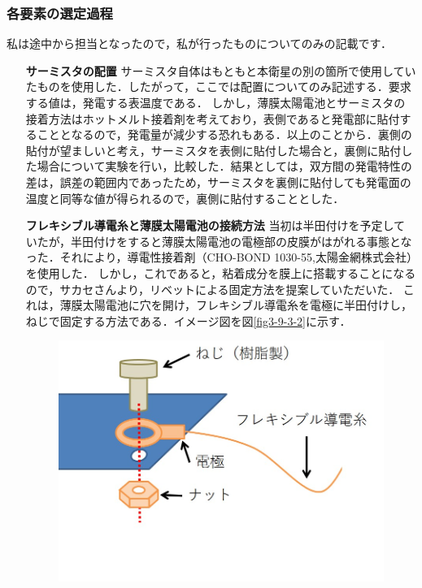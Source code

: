 \subsubsection*{各要素の選定過程}
私は途中から担当となったので，私が行ったものについてのみの記載です．
\begin{itemize}
	\item [\textbf{サーミスタの配置}]
	サーミスタ自体はもともと本衛星の別の箇所で使用していたものを使用した．したがって，ここでは配置についてのみ記述する．要求する値は，発電する表温度である．
	しかし，薄膜太陽電池とサーミスタの接着方法はホットメルト接着剤を考えており，表側であると発電部に貼付することとなるので，発電量が減少する恐れもある．以上のことから．裏側の貼付が望ましいと考え，サーミスタを表側に貼付した場合と，裏側に貼付した場合について実験を行い，比較した．結果としては，双方間の発電特性の差は，誤差の範囲内であったため，サーミスタを裏側に貼付しても発電面の温度と同等な値が得られるので，裏側に貼付することとした．\\
	\item [\textbf{フレキシブル導電糸と薄膜太陽電池の接続方法}]
	当初は半田付けを予定していたが，半田付けをすると薄膜太陽電池の電極部の皮膜がはがれる事態となった．それにより，導電性接着剤（CHO-BOND 1030-55,太陽金網株式会社）を使用した．
	しかし，これであると，粘着成分を膜上に搭載することになるので，サカセさんより，リベットによる固定方法を提案していただいた．
	これは，薄膜太陽電池に穴を開け，フレキシブル導電糸を電極に半田付けし，ねじで固定する方法である．イメージ図を図\ref{fig3-9-3-2}に示す．\\
	\begin{figure}[H]
		\centering
		\includegraphics[scale=0.7]{03/fig/how_to_fix_TFSC.jpg}

\end{figure}
\end{itemize}
